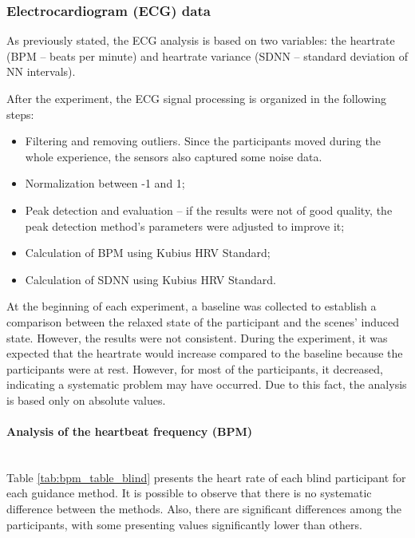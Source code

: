 \subsubsection{Electrocardiogram (ECG) data}
\label{subsubsec:results_ecg_1}

As previously stated, the ECG analysis is based on two variables: the heartrate (BPM – beats per minute) and heartrate variance (SDNN – standard deviation of NN intervals). 

After the experiment, the ECG signal processing is organized in the following steps: 

\begin{itemize}
    \item Filtering and removing outliers. Since the participants moved during the whole experience, the sensors also captured some noise data.
    \item Normalization between -1 and 1;
    \item Peak detection and evaluation – if the results were not of good quality, the peak detection method's parameters were adjusted to improve it; 
    \item Calculation of BPM using Kubius HRV Standard;
    \item Calculation of SDNN using Kubius HRV Standard.
\end{itemize}

At the beginning of each experiment, a baseline was collected to establish a comparison between the relaxed state of the participant and the scenes' induced state. However, the results were not consistent.  During the experiment, it was expected that the heartrate would increase compared to the baseline because the participants were at rest. However, for most of the participants, it decreased, indicating a systematic problem may have occurred. Due to this fact, the analysis is based only on absolute values.

\paragraph{Analysis of the heartbeat frequency (BPM)}\mbox{}\\

Table \ref{tab:bpm_table_blind} presents the heart rate of each blind participant for each guidance method. It is possible to observe that there is no systematic difference between the methods. Also, there are significant differences among the participants, with some presenting values significantly lower than others.

